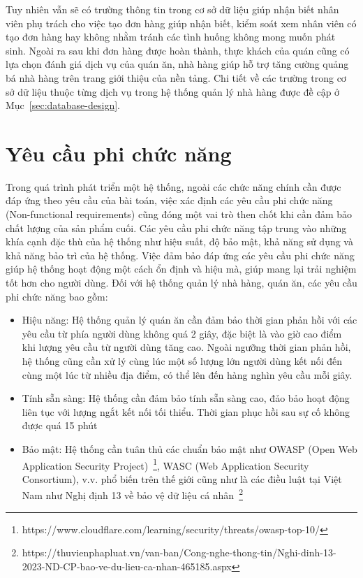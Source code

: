 Tuy nhiên vẫn sẽ có trường thông tin trong cơ sở dữ liệu giúp nhận biết nhân viên phụ trách cho việc tạo đơn hàng giúp nhận biết, kiểm soát xem nhân viên có tạo đơn hàng hay không nhằm tránh các tình huống không mong muốn phát sinh.
Ngoài ra sau khi đơn hàng được hoàn thành, thực khách của quán cũng có lựa chọn đánh giá dịch vụ của quán ăn, nhà hàng giúp hỗ trợ tăng cường quảng bá nhà hàng trên trang giới thiệu của nền tảng.
Chi tiết về các trường trong cơ sở dữ liệu thuộc từng dịch vụ trong hệ thống quản lý nhà hàng được đề cập ở Mục~\ref{sec:database-design}.

\section*{Yêu cầu phi chức năng}
Trong quá trình phát triển một hệ thống, ngoài các chức năng chính cần được đáp ứng theo yêu cầu của bài toán, việc xác định các yêu cầu phi chức năng (Non-functional requirements) cũng đóng một vai trò then chốt khi cần đảm bảo chất lượng của sản phẩm cuối.
Các yêu cầu phi chức năng tập trung vào những khía cạnh đặc thù của hệ thống như hiệu suất, độ bảo mật, khả năng sử dụng và khả năng bảo trì của hệ thống.
Việc đảm bảo đáp ứng các yêu cầu phi chức năng giúp hệ thống hoạt động một cách ổn định và hiệu mà, giúp mang lại trải nghiệm tốt hơn cho người dùng.
Đối với hệ thống quản lý nhà hàng, quán ăn, các yêu cầu phi chức năng bao gồm:
\begin{itemize}
    \item Hiệu năng: Hệ thống quản lý quán ăn cần đảm bảo thời gian phản hồi với các yêu cầu từ phía người dùng không quá 2 giây, đặc biệt là vào giờ cao điểm khi lượng yêu cầu từ người dùng tăng cao.
    Ngoài ngưỡng thời gian phản hồi, hệ thống cũng cần xử lý cùng lúc một số lượng lớn người dùng kết nối đến cùng một lúc từ nhiều địa điểm, có thể lên đến hàng nghìn yêu cầu mỗi giây.
    \item Tính sẵn sàng: Hệ thống cần đảm bảo tính sẵn sàng cao, đảo bảo hoạt động liên tục với lượng ngắt kết nối tối thiểu.
    Thời gian phục hồi sau sự cố không được quá 15 phút
    \item Bảo mật: Hệ thống cần tuân thủ các chuẩn bảo mật như OWASP (Open Web Application Security Project)~\footnote{https://www.cloudflare.com/learning/security/threats/owasp-top-10/}, WASC (Web Application Security Consortium), v.v. phổ biến trên thế giới cũng như là các điều luật tại Việt Nam như Nghị định 13 về bảo vệ dữ liệu cá nhân~\footnote{https://thuvienphapluat.vn/van-ban/Cong-nghe-thong-tin/Nghi-dinh-13-2023-ND-CP-bao-ve-du-lieu-ca-nhan-465185.aspx}
\end{itemize}

